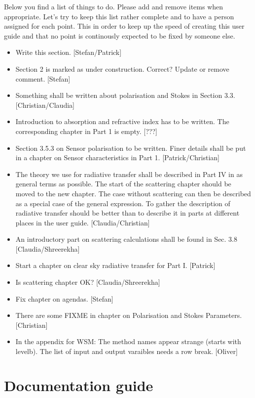 Below you find a list of things to do. Please add and remove items
when appropriate. Let's try to keep this list rather complete and to
have a person assigned for each point. This in order to keep up the
speed of creating this user guide and that no point is continously
expected to be fixed by someone else.
\begin{itemize}
\item Write this section. [Stefan/Patrick]
\item Section 2 is marked as under construction. Correct? Update or
  remove comment. [Stefan]
\item Something shall be written about polarisation and Stokes in Section
   3.3. [Christian/Claudia]
\item Introduction to absorption and refractive index has to be written.
  The corresponding chapter in Part 1 is empty.
  [???]
\item Section 3.5.3 on Sensor polarisation to be written. Finer details
  shall be put in a chapter on Sensor characteristics in Part 1. 
  [Patrick/Christian]
\item The theory we use for radiative transfer shall be described in Part
  IV in as general terms as possible. The start of the scattering chapter
  should be moved to the new chapter. The case without scattering can then
  be described as a special case of the general expression. To gather the
  description of radiative transfer should be better than to describe it 
  in parts at different places in the user guide. [Claudia/Christian]
\item An introductory part on scattering calculations shall be found
   in Sec. 3.8 [Claudia/Shreerekha]
\item Start a chapter on clear sky radiative transfer for Part I. [Patrick]
\item Is scattering chapter OK? [Claudia/Shreerekha]
\item Fix chapter on agendas. [Stefan]
\item There are some FIXME in chapter on Polarisation and Stokes Parameters.
  [Christian]
\item In the appendix for WSM: The method names appear strange (starts
  with levelb). The list of input and output varaibles needs a row break.
  [Oliver]
\end{itemize}




\section{Documentation guide}
\label{sec:intro:guide}

